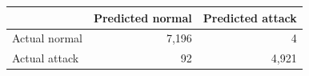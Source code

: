 \begin{tabular}{lrr}
\toprule
 & Predicted normal & Predicted attack \\
\midrule
Actual normal & 7,196 & 4 \\
Actual attack & 92 & 4,921 \\
\bottomrule
\end{tabular}
